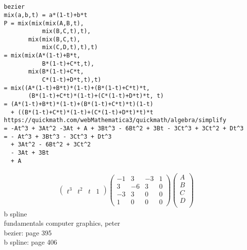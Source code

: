 \documentclass[12pt, border = 4pt, multi]{article} %
\begin{document}
\section*{}
\begin{verbatim}
bezier
mix(a,b,t) = a*(1-t)+b*t
P = mix(mix(mix(A,B,t),
           mix(B,C,t),t),
       mix(mix(B,C,t),
           mix(C,D,t),t),t)
= mix(mix(A*(1-t)+B*t,
           B*(1-t)+C*t,t),
       mix(B*(1-t)+C*t,
           C*(1-t)+D*t,t),t)
= mix((A*(1-t)+B*t)*(1-t)+(B*(1-t)+C*t)*t,
       (B*(1-t)+C*t)*(1-t)+(C*(1-t)+D*t)*t, t)
= (A*(1-t)+B*t)*(1-t)+(B*(1-t)+C*t)*t)(1-t)
  + ((B*(1-t)+C*t)*(1-t)+(C*(1-t)+D*t)*t)*t
https://quickmath.com/webMathematica3/quickmath/algebra/simplify
= -At^3 + 3At^2 -3At + A + 3Bt^3 - 6Bt^2 + 3Bt - 3Ct^3 + 3Ct^2 + Dt^3
= - At^3 + 3Bt^3 - 3Ct^3 + Dt^3
  + 3At^2 - 6Bt^2 + 3Ct^2
  - 3At + 3Bt 
  + A
\end{verbatim}
\begin{align*}
\begin{pmatrix}
t ^ 3 & t ^ 2 & t & 1
\end{pmatrix}
\begin{pmatrix}
-1 & 3 & -3 & 1\\
3 & -6 & 3 & 0\\
-3 & 3 & 0 & 0\\ 
1 & 0 & 0 & 0
\end{pmatrix}
\begin{pmatrix}
A\\
B\\
C\\
D\\
\end{pmatrix}
\end{align*}
b spline\\
fundamentals computer graphics, peter\\
bezier: page 395\\
b spline: page 406
\end{document}
